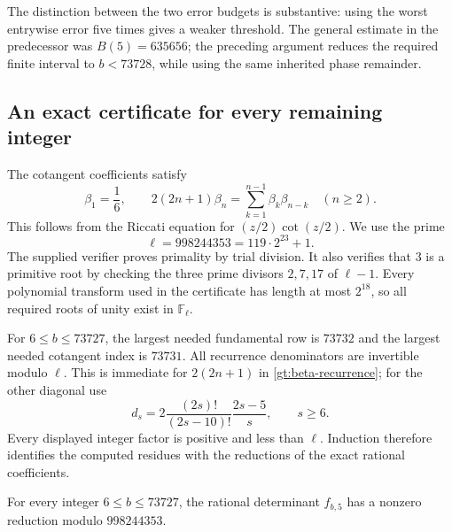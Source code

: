 The distinction between the two error budgets is substantive: using
the worst entrywise error five times gives a weaker threshold.
The general estimate in the predecessor was $B(5)=635656$;
the preceding argument reduces the required finite interval to
$b<73728$, while using the same inherited phase remainder.

\subsection{An exact certificate for every remaining integer}

The cotangent coefficients satisfy
\begin{equation}\label{gt:beta-recurrence}
 \beta_1=\frac16,\qquad
 2(2n+1)\beta_n=\sum_{k=1}^{n-1}\beta_k\beta_{n-k}
                                      \quad(n\ge2).
\end{equation}
This follows from the Riccati equation for $(z/2)\cot(z/2)$.
We use the prime
\[
                         \ell=998244353=119\cdot2^{23}+1.
\]
The supplied verifier proves primality by trial division. It also
verifies that $3$ is a primitive root by checking the three prime
divisors $2,7,17$ of $\ell-1$. Every polynomial transform used in
the certificate has length at most $2^{18}$, so all required roots
of unity exist in $\mathbb F_\ell$.

For $6\le b\le73727$, the largest needed fundamental row is
$73732$ and the largest needed cotangent index is $73731$.
All recurrence denominators are invertible modulo $\ell$.
This is immediate for $2(2n+1)$ in \eqref{gt:beta-recurrence};
for the other diagonal use
\begin{equation}\label{gt:d-factor}
 d_s=2\frac{(2s)!}{(2s-10)!}\frac{2s-5}{s},\qquad s\ge6.
\end{equation}
Every displayed integer factor is positive and less than $\ell$.
Induction therefore identifies the computed residues with the
reductions of the exact rational coefficients.

\begin{proposition}
\label{gt:finite}
For every integer $6\le b\le73727$, the rational determinant
$f_{b,5}$ has a nonzero reduction modulo $998244353$.
\end{proposition}

